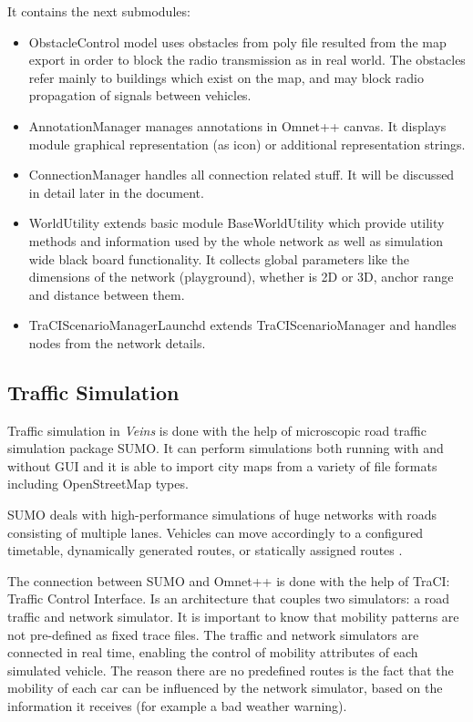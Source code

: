 It contains the next submodules:

\begin{itemize}
  \item ObstacleControl model uses obstacles from poly file resulted from the
  map export in order to block the radio transmission as in real world. The
  obstacles refer mainly to buildings which exist on the map, and may block
  radio propagation of signals between vehicles.
  \item AnnotationManager manages annotations in Omnet++ canvas. It displays
  module graphical representation (as icon) or additional representation
  strings.
  \item ConnectionManager handles all connection related stuff. It will be
  discussed in detail later in the document.
  \item WorldUtility extends basic module BaseWorldUtility which provide utility
  methods and information used by the whole network as well as simulation wide
  black board functionality. It collects global parameters like the dimensions
  of the network (playground), whether is 2D or 3D, anchor range and distance
  between them.
  \item TraCIScenarioManagerLaunchd extends TraCIScenarioManager and handles
  nodes from the network details.
\end{itemize}


\subsection{Traffic Simulation}

Traffic simulation in {\it Veins} is done with the help of microscopic road
traffic simulation package SUMO. It can perform simulations both running with
and without GUI and it is able to import city maps from a variety of file
formats including OpenStreetMap types.

SUMO deals with high-performance simulations of huge networks with roads
consisting of multiple lanes. Vehicles can move accordingly to a configured
timetable, dynamically generated routes, or statically assigned routes
\cite{veins}.

The connection between SUMO and Omnet++ is done with the help of TraCI: Traffic
Control Interface. Is an architecture that couples two simulators: a road
traffic and network simulator. It is important to know that mobility patterns
are not pre-defined as fixed trace files. The traffic and network simulators are
connected in real time, enabling the control of mobility attributes of each
simulated vehicle. The reason there are no predefined routes is the fact that
the mobility of each car can be influenced by the network simulator, based on
the information it receives (for example a bad weather warning).


